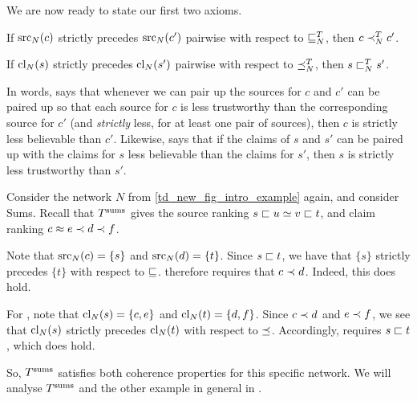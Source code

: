 We are now ready to state our first two axioms.

\begin{axiomlist}
\begin{axiom}[\claimcoherence{}]
    If $\operatorname{src}_N(c)$ strictly precedes $\operatorname{src}_N(c')$ pairwise with respect to
    $\sqsubseteq_N^T$, then $c \prec_N^T c'$.
\end{axiom}
\begin{axiom}[\sourcecoherence{}]
    If $\operatorname{cl}_N(s)$ strictly precedes $\operatorname{cl}_N(s')$ pairwise with respect to
    $\preceq_N^T$, then $s \sqsubset_N^T s'$.
\end{axiom}
\end{axiomlist}

In words, \claimcoherence{} says that whenever we can pair up the sources for
$c$ and $c'$ can be paired up so that each source for $c$ is less trustworthy
than the corresponding source for $c'$ (and \emph{strictly} less, for at least
one pair of sources), then $c$ is strictly less believable than $c'$. Likewise,
\sourcecoherence{} says that if the claims of $s$ and $s'$ can be paired up
with the claims for $s$ less believable than the claims for $s'$, then $s$ is
strictly less trustworthy than $s'$.

\begin{example}
    \label{td_new_ex_coherence_ilustration}
    Consider the network $N$ from \cref{td_new_fig_intro_example} again, and
    consider Sums. Recall that $T^{\operatorname{sums}}$ gives the source ranking $s \sqsubset u \simeq
    v \sqsubset t$, and claim ranking $c \approx e \prec d \prec f$.

    Note that $\operatorname{src}_N(c) = \{s\}$ and $\operatorname{src}_N(d) = \{t\}$. Since $s \sqsubset t$, we
    have that $\{s\}$ strictly precedes $\{t\}$ with respect to $\sqsubseteq$.
    \claimcoherence{} therefore requires that $c \prec d$. Indeed, this does
    hold.

    For \sourcecoherence{}, note that $\operatorname{cl}_N(s) = \{c, e\}$ and
    $\operatorname{cl}_N(t) = \{d, f\}$. Since $c \prec d$ and $e \prec f$, we see that
    $\operatorname{cl}_N(s)$ strictly precedes $\operatorname{cl}_N(t)$ with respect to $\preceq$.
    Accordingly, \sourcecoherence{} requires $s \sqsubset t$, which does hold.

    So, $T^{\operatorname{sums}}$ satisfies both coherence properties for this specific network.
    We will analyse $T^{\operatorname{sums}}$ and the other example in general in .
\end{example}


